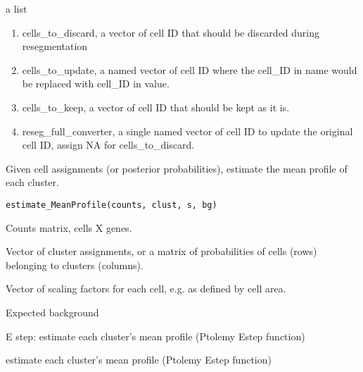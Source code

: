 \documentclass[letterpaper]{book}
\begin{document}
\begin{Value}
a list
\begin{enumerate}

\item{} cells\_to\_discard, a vector of cell ID that should be discarded during resegmentation
\item{} cells\_to\_update, a named vector of cell ID where the cell\_ID in name would be replaced with cell\_ID in value.
\item{} cells\_to\_keep, a vector of cell ID that should be kept as it is.
\item{} reseg\_full\_converter, a single named vector of cell ID to update the original cell ID, assign NA for cells\_to\_discard.

\end{enumerate}

\end{Value}
%
\begin{Description}
Given cell assignments (or posterior probabilities), estimate the mean profile of each cluster.
\end{Description}
%
\begin{Usage}
\begin{verbatim}
estimate_MeanProfile(counts, clust, s, bg)
\end{verbatim}
\end{Usage}
%
\begin{Arguments}
\begin{ldescription}
\item[\code{counts}] Counts matrix, cells X genes.

\item[\code{clust}] Vector of cluster assignments, or a matrix of probabilities of cells (rows) belonging to clusters (columns).

\item[\code{s}] Vector of scaling factors for each cell, e.g. as defined by cell area.

\item[\code{bg}] Expected background
\end{ldescription}
\end{Arguments}
%
\begin{Details}
E step: estimate each cluster's mean profile (Ptolemy Estep function)

estimate each cluster's mean profile (Ptolemy Estep function)
\end{Details}
\end{document}
